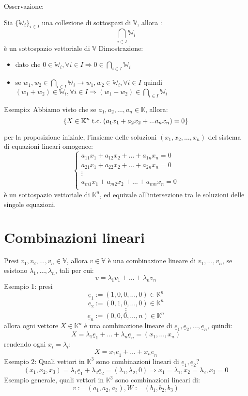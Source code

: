 \documentclass[a4paper,12pt]{article}
\begin{document}
	Osservazione:
	
	Sia $\{\mathbb{W}_i\}_{i \in I}$ una collezione di sottospazi di $\mathbb{V}$, allora :
	\[\bigcap_{i \in I} \mathbb{W}_i\]
	è un sottospazio vettoriale di $\mathbb{V}$ \newline
	Dimostrazione:
	\begin{itemize}
		\item dato che $\underline{0} \in \mathbb{W}_i, \forall i \in I \Rightarrow 0 \in \bigcap_{i \in I} \mathbb{W}_i$
		\item se $w_1, w_2 \in \bigcap_{i \in I} \mathbb{W}_i \rightarrow w_1, w_2 \in \mathbb{W}_i, \forall i \in I$ quindi $(w_1 + w_2) \in \mathbb{W}_i, \forall i \in I \Rightarrow (w_1 + w_2) \in \bigcap_{i \in I} \mathbb{W}_i$
	\end{itemize}
	Esempio: Abbiamo visto che se $a_1, a_2, \dots, a_n \in \mathbb{K}$, allora:
	\[\{X \in \mathbb{K}^n \;\text{t.c.}\; (a_1x_1 + a_2x_2 + ... a_nx_n) = 0\}\]
	
	per la proposizione iniziale, l'insieme delle soluzioni $(x_1, x_2, \dots, x_n)$ del sistema di equazioni lineari omogenee:	
	\[
	\left\{
	\begin{array}{l}
		a_{11}x_1 + a_{12}x_2 + \dots + a_{1n}x_n = 0 \\
		a_{21}x_1 + a_{22}x_2 + \dots + a_{2n}x_n = 0 \\
		\vdots \\
		a_{m1}x_1 + a_{m2}x_2 + \dots + a_{mn}x_n = 0 \\
	\end{array}
	\right.
	\]
	è un sottospazio vettoriale di $\mathbb{K}^n$, ed equivale all'intersezione tra le soluzioni delle singole equazioni.
	
	\section{Combinazioni lineari}
	Presi $v_1, v_2, \dots, v_n \in \mathbb{V}$, allora $v \in \mathbb{V}$ è una combinazione lineare di $v_1, \dots, v_n$, se esistono $\lambda_1, \dots, \lambda_n$, tali per cui:
	\[v = \lambda_1 v_1 + \dots + \lambda_n v_n\]
	Esempio 1: presi
	\[\underline{e}_1 := (1, 0, 0, \dots, 0) \in \mathbb{K}^n\]
	\[\underline{e}_2 := (0, 1, 0, \dots, 0) \in \mathbb{K}^n\]
	\[\vdots\]
	\[\underline{e}_n := (0, 0, 0, \dots, n) \in \mathbb{K}^n\]
	allora ogni vettore $X \in \mathbb{K}^n$ è una combinazione lineare di $\underline{e}_1, \underline{e}_2, \dots, \underline{e}_n$, quindi:
	\[X = \lambda_1 \underline{e}_1 + \dots + \lambda_n \underline{e}_n = (x_1, \dots, x_n)\]
	rendendo ogni $x_i = \lambda_i$:
	\[X = x_1 \underline{e}_1 + \dots + x_n \underline{e}_n\]
	Esempio 2: Quali vettori in $\mathbb{K}^3$ sono combinazioni lineari di $\underline{e}_1, \underline{e}_2$?
	\[(x_1,x_2,x_3) = \lambda_1 \underline{e}_1 + \lambda_2 \underline{e}_2 = (\lambda_1, \lambda_2, 0) \Rightarrow x_1 = \lambda_1, x_2 = \lambda_2, x_3 = 0\] 
	Esempio generale, quali vettori in $\mathbb{K}^3$ sono combinazioni lineari di:
	\[v := (a_1, a_2, a_3), W := (b_1, b_2, b_3)\]
	
\end{document}
